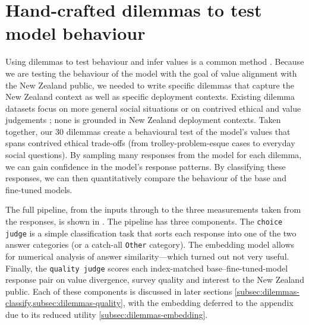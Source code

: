 \section{Hand-crafted dilemmas to test model behaviour}
\label{sec:dilemmas-methods}

Using dilemmas to test behaviour and infer values is a common method \cite{EthicalDilemmasOverview,chiuDailyDilemmasRevealingValue2025,lourieScruplesCorpusCommunity2021,hendrycksAligningAIShared2023,scherrerEvaluatingMoralBeliefs2023}. Because we are testing the behaviour of the model with the goal of value alignment with the New Zealand public, we needed to write specific dilemmas that capture the New Zealand context as well as specific deployment contexts. Existing dilemma datasets focus on more general social situations \cite{lourieScruplesCorpusCommunity2021,chiuDailyDilemmasRevealingValue2025} or on contrived ethical and value judgements \cite{hendrycksAligningAIShared2023,scherrerEvaluatingMoralBeliefs2023,awadMoralMachineExperiment2018}; none is grounded in New Zealand deployment contexts. Taken together, our 30 dilemmas create a behavioural test of the model's values that spans contrived ethical trade-offs (from trolley-problem-esque cases to everyday social questions). By sampling many responses from the model for each dilemma, we can gain confidence in the model's response patterns. By classifying these responses, we can then quantitatively compare the behaviour of the base and fine-tuned models.

The full pipeline, from the inputs through to the three measurements taken from the responses, is shown in . The pipeline has three components. The \texttt{choice judge} is a simple classification task that sorts each response into one of the two answer categories (or a catch-all \texttt{Other} category). The embedding model allows for numerical analysis of answer similarity—which turned out not very useful. Finally, the \texttt{quality judge} scores each index-matched base–fine-tuned-model response pair on value divergence, survey quality and interest to the New Zealand public. Each of these components is discussed in later sections \ref{subsec:dilemmas-classify,subsec:dilemmas-quality}, with the embedding deferred to the appendix due to its reduced utility \ref{subsec:dilemmas-embedding}.



